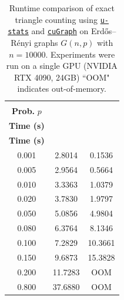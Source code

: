 \documentclass[sn-mathphys, natbib=false]{sn-jnl}
\newcommand{\libref}[2]{\href{#2}{\texttt{#1}}}
\def\package{\libref{u-stats}{https://github.com/zrq1706/U-Statistics-Python}}
\theoremstyle{plain}
\theoremstyle{definition}
\def\package{\libref{u-stats}{https://github.com/zrq1706/U-Statistics-Python}}
\def\cugraph{\libref{cuGraph}{https://docs.rapids.ai/api/cugraph/stable/}}
\begin{document}
\begin{bibunit}[agsm]
\begin{table}[htbp]
\centering
\caption{Runtime comparison of exact triangle counting  using \package{} and \cugraph{} on Erd\H{o}s--R\'enyi graphs $G(n, p)$ with $n = 10000$. Experiments were run on a single GPU (NVIDIA RTX 4090, 24GB) ``OOM" indicates out-of-memory.}
\label{tab:triangle_counting_gpu}
\begin{tabular}{ccc}
\toprule
\makecell{\textbf{Edge} \\ \textbf{Prob.} $p$} & 
\makecell{\textbf{\package{}} \\ \textbf{Time (s)}} & 
\makecell{\textbf{\cugraph{}} \\ \textbf{Time (s)}} \\
\midrule
0.001 & 2.8014 & 0.1536 \\
0.005 & 2.9564 & 0.5664 \\
0.010 & 3.3363 & 1.0379 \\
0.020 & 3.7830 & 1.9797 \\
0.050 & 5.0856 & 4.9804 \\
0.080 & 6.3764 & 8.1346 \\
0.100 & 7.2829 & 10.3661 \\
0.150 & 9.6873 & 15.3828 \\
0.200 & 11.7283 & OOM \\
0.800 & 37.6880 & OOM \\
\bottomrule
\end{tabular}
\end{table}


\end{bibunit}
\end{document}
